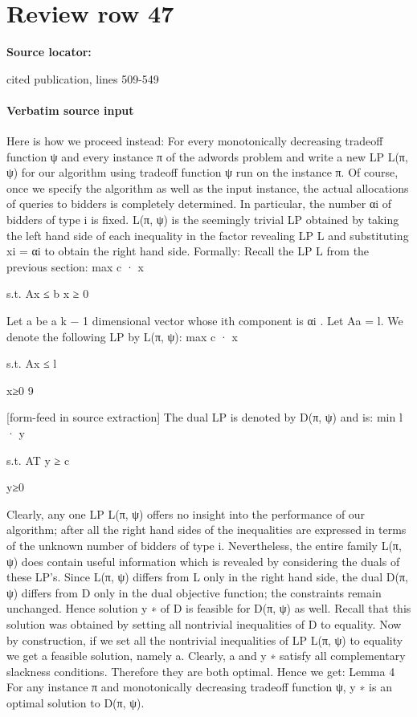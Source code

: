 \documentclass[10pt]{article}
\begin{document}
\section*{Review row 47}
\textbf{Source locator:} {\footnotesize\raggedright cited publication, lines 509-\allowbreak{}549\par}
\paragraph{Verbatim source input}
\begin{ReviewVerbatim}
Here is how we proceed instead: For every monotonically decreasing tradeoff function ψ and
every instance π of the adwords problem and write a new LP L(π, ψ) for our algorithm using
tradeoff function ψ run on the instance π. Of course, once we specify the algorithm as well
as the input instance, the actual allocations of queries to bidders is completely determined.
In particular, the number αi of bidders of type i is fixed. L(π, ψ) is the seemingly trivial
LP obtained by taking the left hand side of each inequality in the factor revealing LP L and
substituting xi = αi to obtain the right hand side. Formally:
Recall the LP L from the previous section:
max c · x

s.t. Ax ≤ b x ≥ 0

Let a be a k − 1 dimensional vector whose ith component is αi . Let Aa = l. We denote the
following LP by L(π, ψ):
max c · x

s.t. Ax ≤ l

x≥0
9


[form-feed in source extraction]
The dual LP is denoted by D(π, ψ) and is:
min l · y

s.t. AT y ≥ c

y≥0

Clearly, any one LP L(π, ψ) offers no insight into the performance of our algorithm; after
all the right hand sides of the inequalities are expressed in terms of the unknown number of
bidders of type i. Nevertheless, the entire family L(π, ψ) does contain useful information which
is revealed by considering the duals of these LP’s.
Since L(π, ψ) differs from L only in the right hand side, the dual D(π, ψ) differs from D only
in the dual objective function; the constraints remain unchanged. Hence solution y ∗ of D is
feasible for D(π, ψ) as well. Recall that this solution was obtained by setting all nontrivial
inequalities of D to equality.
Now by construction, if we set all the nontrivial inequalities of LP L(π, ψ) to equality we get a
feasible solution, namely a. Clearly, a and y ∗ satisfy all complementary slackness conditions.
Therefore they are both optimal. Hence we get:
Lemma 4 For any instance π and monotonically decreasing tradeoff function ψ, y ∗ is an
optimal solution to D(π, ψ).
\end{ReviewVerbatim}
\end{document}
